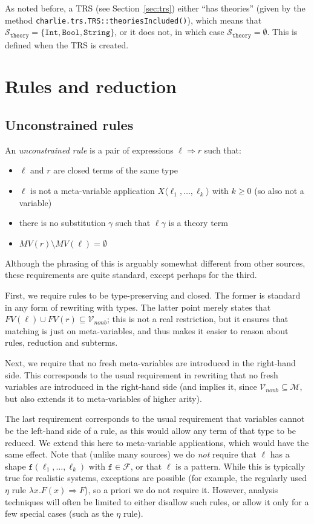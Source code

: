 \documentclass{lmcs}
\theoremstyle{theorem}\newtheorem{theorem}{Theorem}
\theoremstyle{theorem}\newtheorem{lemma}[theorem]{Lemma}
\theoremstyle{theorem}\newtheorem{corollary}[theorem]{Corollary}
\theoremstyle{definition}\newtheorem{definition}[theorem]{Definition}
\theoremstyle{definition}\newtheorem{example}[theorem]{Example}
\newcommand{\F}{\mathcal{F}}
\newcommand{\M}{\mathcal{M}}
\newcommand{\Vfree}{\mathcal{V}_{\mathit{nonb}}}
\newcommand{\thSorts}{\mathcal{S}_{\mathtt{theory}}}
\newcommand{\FV}{\mathit{FV}}
\newcommand{\FMV}{\mathit{MV}}
\newcommand{\identifier}[1]{\mathtt{#1}}
\newcommand{\afun}{\identifier{f}}
\newcommand{\avar}{x}
\newcommand{\Avar}{X}
\newcommand{\AFvar}{F}
\newcommand{\abs}[2]{\lambda #1.#2}
\newcommand{\meta}[2]{#1\langle#2\rangle}
\newcommand{\arrz}{\Rightarrow}
\newcommand{\symb}[1]{\mathtt{#1}}
\newcommand{\bool}{\symb{Bool}}
\newcommand{\tint}{\symb{Int}}
\newcommand{\tstring}{\symb{String}}
\begin{document}
As noted before, a TRS (see Section~\ref{sec:trs}) either ``has theories''
(given by the method \texttt{charlie.trs.TRS::theoriesIncluded()}), which
means that $\thSorts = \{\tint,\bool,\tstring\}$, or it does not, in which case
$\thSorts = \emptyset$.  This is defined when the TRS is created.

\section{Rules and reduction}

\subsection{Unconstrained rules}

An \emph{unconstrained rule} is a pair of expressions $\ell \arrz r$ such that:
\begin{itemize}
\item $\ell$ and $r$ are closed terms of the same type
\item $\ell$ is not a meta-variable application $\meta{\Avar}{\ell_1,\dots,
  \ell_k}$ with $k \geq 0$ (so also not a variable)
\item there is no substitution $\gamma$ such that $\ell\gamma$ is a theory term
\item $\FMV(r) \setminus \FMV(\ell) = \emptyset$
\end{itemize}

Although the phrasing of this is arguably somewhat different from other sources,
these requirements are quite standard, except perhaps for the third.

First, we require rules to be type-preserving and closed.  The former is
standard in any form of rewriting with types.  The latter point merely states
that $\FV(\ell) \cup \FV(r) \subseteq \Vfree$; this is not a real restriction,
but it ensures that matching is just on meta-variables, and thus makes it
easier to reason about rules, reduction and subterms.

Next, we require that no fresh meta-variables are introduced in the right-hand
side.  This corresponds to the usual requirement in rewriting that no fresh
variables are introduced in the right-hand side (and implies it, since
$\Vfree \subseteq \M$, but also extends it to meta-variables of higher arity).

The last requirement corresponds to the usual requirement that variables cannot
be the left-hand side of a rule, as this would allow any term of that type to be
reduced.  We extend this here to meta-variable applications, which would have
the same effect.
Note that (unlike many sources) we do \emph{not} require that $\ell$ has a shape
$\afun(\ell_1,\dots,\ell_k)$ with $\afun \in \F$, or that $\ell$ is a pattern.
While this is typically true for realistic systems, exceptions are possible
(for example, the regularly used $\eta$ rule $\abs{\avar}{\AFvar(\avar)} \arrz
\AFvar$), so a priori we do not require it.  However, analysis techniques will
often be limited to either disallow such rules, or allow it only for a few
special cases (such as the $\eta$ rule).
\end{document}
